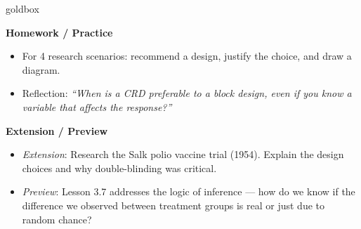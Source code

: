 \documentclass[10pt]{article}
\begin{document}
\begin{skillbox}{goldbox}
\begin{minipage}[t]{0.48\linewidth}
    \textbf{Homework / Practice}
    \begin{itemize}
        \item For 4 research scenarios: recommend a design, justify the choice, and
              draw a diagram.
        \item Reflection: \textit{``When is a CRD preferable to a block design, even
              if you know a variable that affects the response?''}
    \end{itemize}
\end{minipage}
\hfill
\begin{minipage}[t]{0.48\linewidth}
    \textbf{Extension / Preview}
    \begin{itemize}
        \item \textit{Extension}: Research the Salk polio vaccine trial (1954). Explain
              the design choices and why double-blinding was critical.
        \item \textit{Preview}: Lesson 3.7 addresses the logic of inference ---
              how do we know if the difference we observed between treatment groups
              is real or just due to random chance?
    \end{itemize}
\end{minipage}
\end{skillbox}
\end{document}
